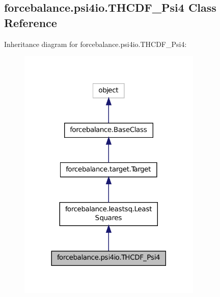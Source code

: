 \hypertarget{classforcebalance_1_1psi4io_1_1THCDF__Psi4}{\subsection{forcebalance.\-psi4io.\-T\-H\-C\-D\-F\-\_\-\-Psi4 Class Reference}
\label{classforcebalance_1_1psi4io_1_1THCDF__Psi4}
}


Inheritance diagram for forcebalance.\-psi4io.\-T\-H\-C\-D\-F\-\_\-\-Psi4\-:\nopagebreak
\begin{figure}[H]
\begin{center}
\leavevmode
\includegraphics[width=248pt]{classforcebalance_1_1psi4io_1_1THCDF__Psi4__inherit__graph}
\end{center}
\end{figure}


